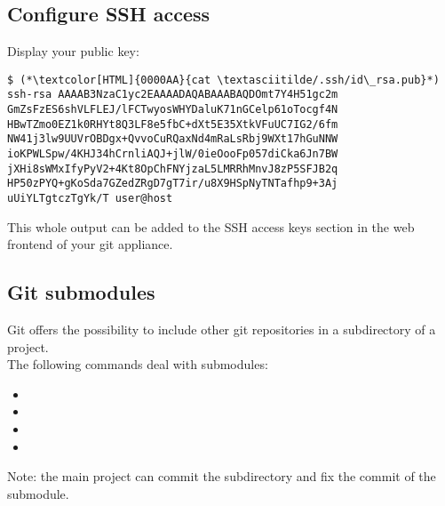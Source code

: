 \subsection{Configure SSH access}
\begin{frame}[fragile]
  \subslidetitle
  Display your public key:
  \begin{lstlisting}
$ (*\textcolor[HTML]{0000AA}{cat \textasciitilde/.ssh/id\_rsa.pub}*)
ssh-rsa AAAAB3NzaC1yc2EAAAADAQABAAABAQDOmt7Y4H51gc2m
GmZsFzES6shVLFLEJ/lFCTwyosWHYDaluK71nGCelp61oTocgf4N
HBwTZmo0EZ1k0RHYt8Q3LF8e5fbC+dXt5E35XtkVFuUC7IG2/6fm
NW41j3lw9UUVrOBDgx+QvvoCuRQaxNd4mRaLsRbj9WXt17hGuNNW
ioKPWLSpw/4KHJ34hCrnliAQJ+jlW/0ieOooFp057diCka6Jn7BW
jXHi8sWMxIfyPyV2+4Kt8OpChFNYjzaL5LMRRhMnvJ8zP5SFJB2q
HP50zPYQ+gKoSda7GZedZRgD7gT7ir/u8X9HSpNyTNTafhp9+3Aj
uUiYLTgtczTgYk/T user@host
\end{lstlisting}

  This whole output can be added to the SSH access keys
  section in the web frontend of your git appliance.
\end{frame}

\subsection{Git submodules}
\begin{frame}[fragile]
  \subslidetitle
  Git offers the possibility to include other git repositories in a subdirectory of a project.
  \\
  \vspace{1em}
  The following commands deal with submodules:
  \begin{itemize}
    \item {}
    \item {}
    \item {}
    \item {}
  \end{itemize}
  \vspace{1em}
  Note: the main project can commit the subdirectory and fix the commit of the submodule.
\end{frame}

